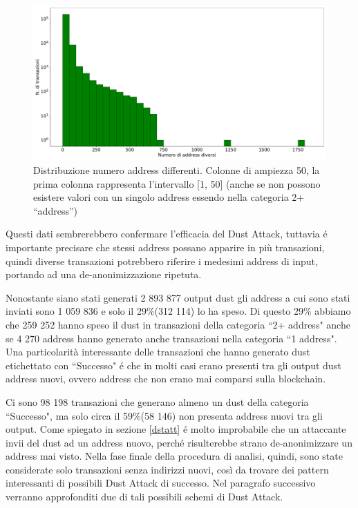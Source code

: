  \begin{figure}[h!]
     \centering
     \includegraphics[scale=0.3]{Grafici/num_addr.pdf}
     \caption{Distribuzione numero address differenti. Colonne di ampiezza 50, la prima colonna rappresenta l'intervallo [1, 50] (anche se non possono esistere valori con un singolo address essendo nella categoria 2+ ``address'')}
     \label{fig:diff_addr}
 \end{figure}
\FloatBarrier
Questi dati sembrerebbero confermare l'efficacia del Dust Attack, tuttavia é importante precisare che stessi address possano apparire in più transazioni, quindi diverse transazioni potrebbero riferire i medesimi address di input, portando ad una de-anonimizzazione ripetuta. 

Nonostante siano stati generati 2 893 877 output dust gli address a cui sono stati inviati sono 1 059 836 e solo il 29\%(312 114) lo ha speso. Di questo 29\% abbiamo che 259 252 hanno speso il dust in transazioni della categoria ``2+ address" anche se 4 270 address hanno generato anche transazioni nella categoria ``1 address". Una particolarità interessante delle transazioni che hanno generato dust etichettato con ``Successo" é che in molti casi erano presenti tra gli output dust address nuovi, ovvero address che non erano mai comparsi sulla blockchain. 

Ci sono 98 198 transazioni che generano almeno un dust della categoria ``Successo", ma solo circa il 59\%(58 146) non presenta address nuovi tra gli output. Come spiegato in sezione \ref{dstatt} é molto improbabile che un attaccante invii del dust ad un address nuovo, perché risulterebbe strano de-anonimizzare un address mai visto. Nella fase finale della procedura di analisi, quindi, sono state considerate solo transazioni senza indirizzi nuovi, così da trovare dei pattern interessanti di possibili Dust Attack di successo. Nel paragrafo successivo verranno approfonditi due di tali possibili schemi di Dust Attack. 

